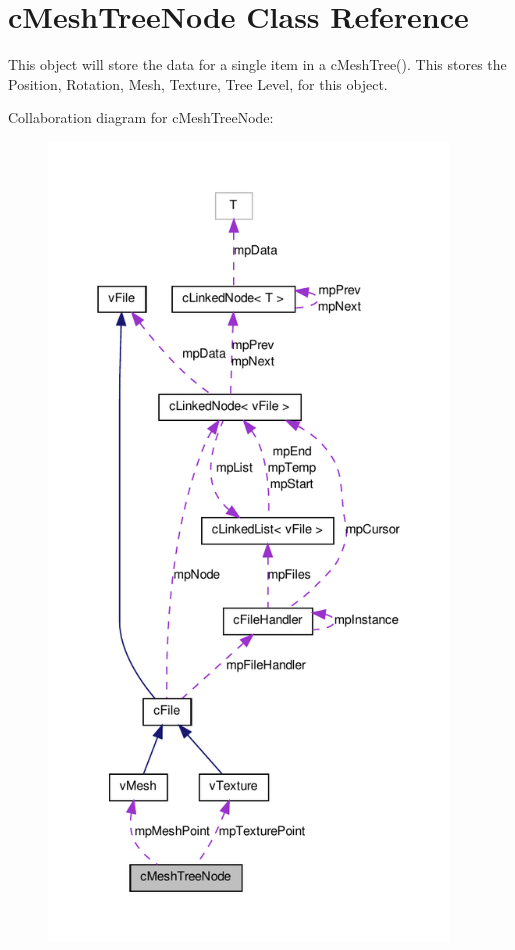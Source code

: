 \hypertarget{classc_mesh_tree_node}{
\section{cMeshTreeNode Class Reference}
\label{classc_mesh_tree_node}
}


This object will store the data for a single item in a cMeshTree(). This stores the Position, Rotation, Mesh, Texture, Tree Level, for this object.  




Collaboration diagram for cMeshTreeNode:
\nopagebreak
\begin{figure}[H]
\begin{center}
\leavevmode
\includegraphics[height=600pt]{classc_mesh_tree_node__coll__graph}
\end{center}
\end{figure}
